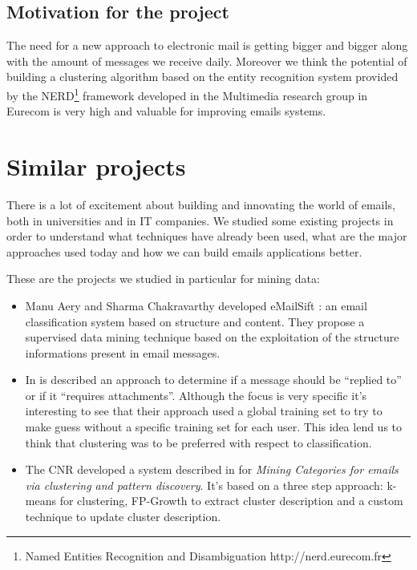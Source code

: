 \documentclass[a4paper,12pt]{report}
\begin{document}
\section{Motivation for the project}

The need for a new approach to electronic mail is getting bigger and bigger along with the amount of messages we receive daily. Moreover we think the potential of building a clustering algorithm based on the entity recognition system provided by the NERD\footnote{Named Entities Recognition and Disambiguation http://nerd.eurecom.fr} framework developed in the Multimedia research group in Eurecom is very high and valuable for improving emails systems.


\chapter{Similar projects}

There is a lot of excitement about building and innovating the world of emails, both in universities and in IT companies. We studied some existing projects in order to understand what techniques have already been used, what are the major approaches used today and how we can build emails applications better.


These are the projects we studied in particular for mining data:
\begin{itemize}
\item Manu Aery and Sharma Chakravarthy developed eMailSift \cite{Aery2005}: an email classification system based on structure and content. They propose a supervised data mining technique based on the exploitation of the structure informations present in email messages.
\item In \cite{Drezde2008} is described an approach to determine if a message should be ``replied to'' or if it ``requires attachments''. Although the focus is very specific it's interesting to see that their approach used a global training set to try to make guess without a specific training set for each user. This idea lend us to think that clustering was to be preferred with respect to classification.
\item The CNR developed a system described in \cite{Manco2008} for \emph{Mining Categories for emails via clustering and pattern discovery}. It's based on a three step approach: k-means for clustering, FP-Growth to extract cluster description and a custom technique to update cluster description.
\end{itemize}
\end{document}
